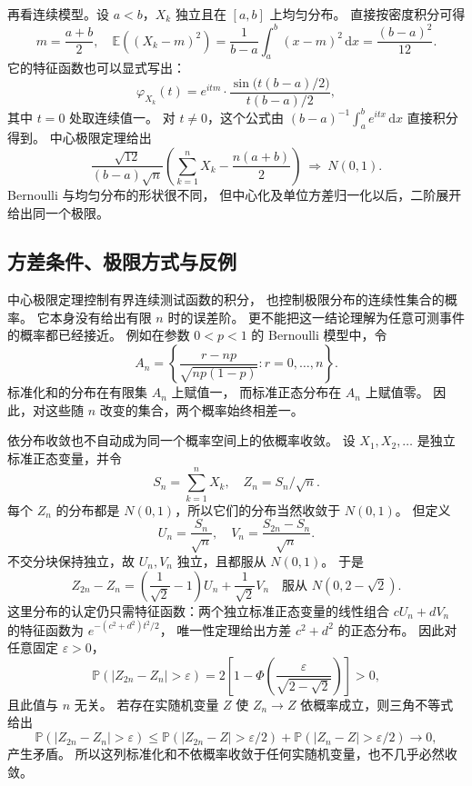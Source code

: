 \ProseParagraphBreak

再看连续模型。设 \(a<b\)，\(X_k\) 独立且在 \([a,b]\) 上均匀分布。
直接按密度积分可得
\[
 m=\frac{a+b}{2},\quad
 \mathbb E((X_k-m)^2)
 =\frac{1}{b-a}\int_a^b(x-m)^2\,\mathrm dx
 =\frac{(b-a)^2}{12}.
\]
它的特征函数也可以显式写出：
\[
 \varphi_{X_k}(t)
 =e^{itm}\cdot\frac{\sin\bigl(t(b-a)/2\bigr)}{t(b-a)/2},
\]
其中 \(t=0\) 处取连续值一。
对 \(t\ne0\)，这个公式由
\((b-a)^{-1}\int_a^b e^{itx}\,\mathrm dx\) 直接积分得到。
中心极限定理给出
\[
 \frac{\sqrt{12}}{(b-a)\sqrt n}
       \left(\sum_{k=1}^nX_k-\frac{n(a+b)}{2}\right)
 \ \Rightarrow\ N(0,1).
\]
Bernoulli 与均匀分布的形状很不同，
但中心化及单位方差归一化以后，二阶展开给出同一个极限。

\subsection{方差条件、极限方式与反例}
\label{b1:subsec:300704}

中心极限定理控制有界连续测试函数的积分，
也控制极限分布的连续性集合的概率。
它本身没有给出有限 \(n\) 时的误差阶。
更不能把这一结论理解为任意可测事件的概率都已经接近。
例如在参数 \(0<p<1\) 的 Bernoulli 模型中，令
\[
 A_n=\left\{\frac{r-np}{\sqrt{np(1-p)}}:r=0,\ldots,n\right\}.
\]
标准化和的分布在有限集 \(A_n\) 上赋值一，
而标准正态分布在 \(A_n\) 上赋值零。
因此，对这些随 \(n\) 改变的集合，两个概率始终相差一。

\ProseParagraphBreak

依分布收敛也不自动成为同一个概率空间上的依概率收敛。
设 \(X_1,X_2,\ldots\) 是独立标准正态变量，并令
\[
 S_n=\sum_{k=1}^nX_k,\quad Z_n=S_n/\sqrt n.
\]
每个 \(Z_n\) 的分布都是 \(N(0,1)\)，所以它们的分布当然收敛于
\(N(0,1)\)。
但定义
\[
 U_n=\frac{S_n}{\sqrt n},\quad
 V_n=\frac{S_{2n}-S_n}{\sqrt n}.
\]
不交分块保持独立，故 \(U_n,V_n\) 独立，且都服从 \(N(0,1)\)。
于是
\[
 Z_{2n}-Z_n
 =\left(\frac{1}{\sqrt2}-1\right)U_n+\frac{1}{\sqrt2}V_n
 \quad\text{服从 }N(0,2-\sqrt2).
\]
这里分布的认定仍只需特征函数：两个独立标准正态变量的线性组合
\(cU_n+dV_n\) 的特征函数为 \(e^{-(c^2+d^2)t^2/2}\)，
唯一性定理给出方差 \(c^2+d^2\) 的正态分布。
因此对任意固定 \(\varepsilon>0\)，
\[
 \mathbb P(|Z_{2n}-Z_n|>\varepsilon)
 =2\left[1-\Phi\left(\frac{\varepsilon}{\sqrt{2-\sqrt2}}\right)\right]>0,
\]
且此值与 \(n\) 无关。
若存在实随机变量 \(Z\) 使 \(Z_n\to Z\) 依概率成立，则三角不等式给出
\[
 \mathbb P(|Z_{2n}-Z_n|>\varepsilon)
 \leq
 \mathbb P(|Z_{2n}-Z|>\varepsilon/2)
 +\mathbb P(|Z_n-Z|>\varepsilon/2)
 \longrightarrow0,
\]
产生矛盾。
所以这列标准化和不依概率收敛于任何实随机变量，也不几乎必然收敛。

